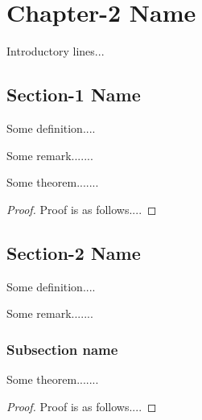 \chapter{Chapter-2 Name}

Introductory lines...



\section{Section-1 Name}
\begin{definition}\label{abc}
Some definition....
\end{definition}

\begin{remark}
Some remark.......
\end{remark}



\begin{theorem}
Some theorem.......
\end{theorem}

\begin{proof}
Proof is as follows....
\end{proof}

\section{Section-2 Name}
\begin{definition}\label{abc2}
Some definition....
\end{definition}

\begin{remark}
Some remark.......
\end{remark}

\subsection{Subsection name}

\begin{theorem}
Some theorem.......
\end{theorem}

\begin{proof}
Proof is as follows....
\end{proof}
